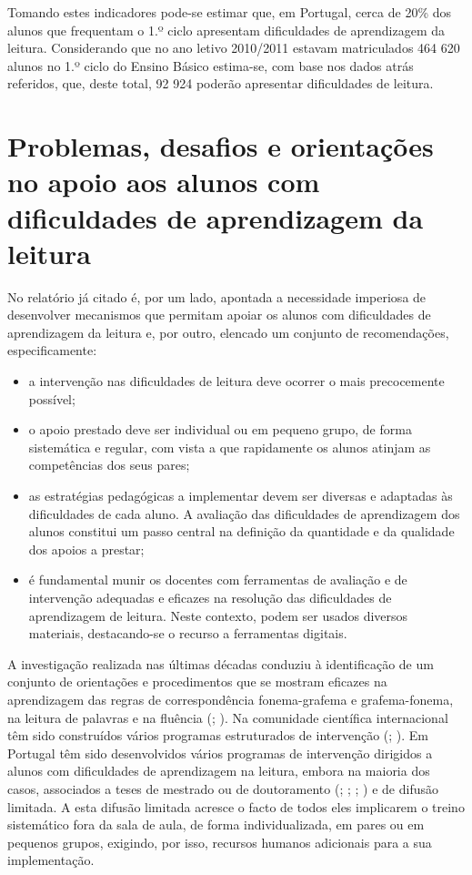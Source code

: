 \documentclass[
  oneside,
  11pt, a4paper,
  footinclude=true,
  headinclude=true,
  cleardoublepage=empty
]{scrbook}
\begin{document}
Tomando estes indicadores pode-se estimar que, em Portugal, cerca de 20\% dos alunos que frequentam o 1.º ciclo apresentam dificuldades de aprendizagem da leitura. Considerando que no ano letivo 2010/2011 estavam matriculados 464 620 alunos no 1.º ciclo do Ensino Básico estima-se, com base nos dados atrás referidos, que, deste total, 92 924 poderão apresentar dificuldades de leitura.

\section{Problemas, desafios e orientações no apoio aos alunos com dificuldades de aprendizagem da leitura}

No relatório já citado é, por um lado, apontada a necessidade imperiosa de desenvolver mecanismos que permitam apoiar os alunos com dificuldades de aprendizagem da leitura e, por outro, elencado um conjunto de recomendações, especificamente:
\begin{itemize}
  \item a intervenção nas dificuldades de leitura deve ocorrer o mais precocemente possível;
  \item o apoio prestado deve ser individual ou em pequeno grupo, de forma sistemática e regular, com vista a que rapidamente os alunos atinjam as competências dos seus pares;
  \item as estratégias pedagógicas a implementar devem ser diversas e adaptadas às dificuldades de cada aluno. A avaliação das dificuldades de aprendizagem dos alunos constitui um passo central na definição da quantidade e da qualidade dos apoios a prestar;
  \item é fundamental munir os docentes com ferramentas de avaliação e de intervenção adequadas e eficazes na resolução das dificuldades de aprendizagem de leitura. Neste contexto, podem ser usados diversos materiais, destacando-se o recurso a ferramentas digitais.
\end{itemize}

A investigação realizada nas últimas décadas conduziu à identificação de um conjunto de orientações e procedimentos que se mostram eficazes na aprendizagem das regras de correspondência fonema-grafema e grafema-fonema, na leitura de palavras e na fluência (\citealp{Citoler}; \citealp{Snowling}). Na comunidade científica internacional têm sido construídos vários programas estruturados de intervenção (\citealp{Karemaker}; \citealp{Olson}). Em Portugal têm sido desenvolvidos vários programas de intervenção dirigidos a alunos com dificuldades de aprendizagem na leitura, embora na maioria dos casos, associados a teses de mestrado ou de doutoramento (\citealp{Azevedo}; \citealp{Fernandes}; \citealp{Ferreira}; \citealp{Ribeiro2005}) e de difusão limitada. A esta difusão limitada acresce o facto de todos eles implicarem o treino  sistemático fora da sala de aula, de forma individualizada, em pares ou em pequenos  grupos,  exigindo,  por  isso,  recursos  humanos adicionais para a sua implementação.
\end{document}
